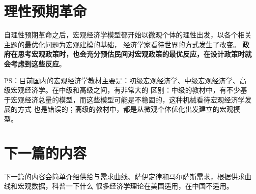\documentclass[UTF8]{article}
\begin{document}
\section{理性预期革命}
    自理性预期革命之后，宏观经济学模型都开始以微观个体的理性出发，以各个相关主题的最优化问题为宏观建模的基础，
    经济学家看待世界的方式发生了改变。
    \textbf{政府在思考宏观政策时，也会充分预估民间对宏观政策的最优反应，在设计政策时就会考虑到这些反应}。\par
    PS：目前国内的宏观经济学教材主要是：初级宏观经济学、中级宏观经济学、高级宏观经济学。在中级和高级之间，有非常大的
    区别：中级的教材中，有不少基于宏观经济总量的模型，而这些模型可能是不稳固的，这种机械看待宏观经济学发展的方式
    也是错误的；高级的教材中，都是从微观个体优化出发建立的宏观模型。

\section{下一篇的内容}
    下一篇的内容会简单介绍供给与需求曲线、萨伊定律和马尔萨斯需求，根据供求曲线和宏观数据，科普一下什么
    很多经济学理论在美国适用，在中国不适用。
\end{document}
